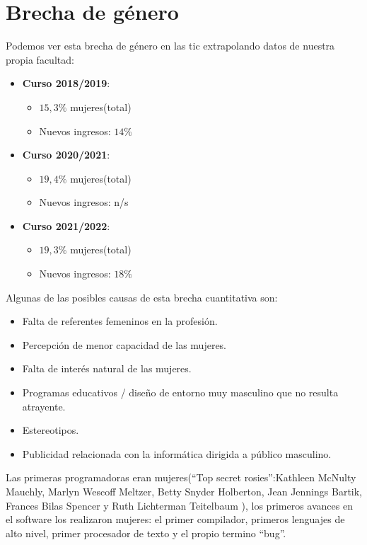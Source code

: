 \section{Brecha de género}

Podemos ver esta brecha de género en las \gls{tic} extrapolando datos de nuestra propia facultad:
\begin{itemize}
    \item\textbf{Curso 2018/2019}:
    \begin{itemize}
        \item $15,3\%$ mujeres(total)
        \item Nuevos ingresos:  $14\%$
    \end{itemize}
    \item\textbf{Curso 2020/2021}:
    \begin{itemize}
        \item $19,4\%$ mujeres(total)
        \item Nuevos ingresos:  n/s
    \end{itemize}
    \item\textbf{Curso 2021/2022}:
    \begin{itemize}
        \item $19,3\%$ mujeres(total)
        \item Nuevos ingresos:  $18\%$
    \end{itemize}
\end{itemize}

Algunas de las posibles causas de esta brecha cuantitativa son:
\begin{itemize}
    \item Falta de referentes femeninos en la profesión.
    \item Percepción de menor capacidad de las mujeres.
    \item Falta de interés natural de las mujeres.
    \item Programas educativos / diseño de entorno muy masculino que no resulta atrayente.
    \item Estereotipos.
    \item Publicidad relacionada con la informática dirigida a público masculino.
\end{itemize}

Las primeras programadoras eran mujeres(``Top secret rosies'':Kathleen
McNulty Mauchly, Marlyn Wescoff Meltzer, Betty Snyder Holberton, Jean
Jennings Bartik, Frances Bilas Spencer y Ruth Lichterman Teitelbaum ), los primeros avances en el software los realizaron mujeres: el primer compilador, primeros lenguajes de alto nivel, primer procesador de texto y el propio termino ``bug''.


